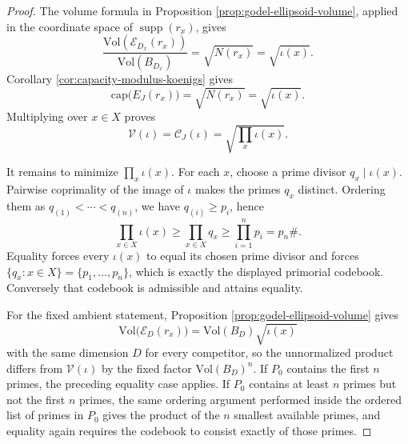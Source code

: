\begin{proof}
The volume formula in Proposition \ref{prop:godel-ellipsoid-volume}, applied in the coordinate space of \(\operatorname{supp}(r_x)\), gives
\[
\frac{\mathrm{Vol}(\mathcal E_{D_x}(r_x))}{\mathrm{Vol}(B_{D_x})}
=\sqrt{N(r_x)}=\sqrt{\iota(x)}.
\]
Corollary \ref{cor:capacity-modulus-koenigs} gives
\[
\mathrm{cap}\bigl(E_J(r_x)\bigr)=\sqrt{N(r_x)}=\sqrt{\iota(x)}.
\]
Multiplying over \(x\in X\) proves
\[
\mathcal V(\iota)=\mathcal C_J(\iota)=\sqrt{\prod_x\iota(x)}.
\]

It remains to minimize \(\prod_x\iota(x)\). For each \(x\), choose a prime divisor \(q_x\mid\iota(x)\). Pairwise coprimality of the image of \(\iota\) makes the primes \(q_x\) distinct. Ordering them as \(q_{(1)}<\cdots<q_{(n)}\), we have \(q_{(i)}\ge p_i\), hence
\[
\prod_{x\in X}\iota(x)\ge \prod_{x\in X}q_x\ge\prod_{i=1}^{n}p_i=p_n\#.
\]
Equality forces every \(\iota(x)\) to equal its chosen prime divisor and forces \(\{q_x:x\in X\}=\{p_1,\dots,p_n\}\), which is exactly the displayed primorial codebook. Conversely that codebook is admissible and attains equality.

For the fixed ambient statement, Proposition \ref{prop:godel-ellipsoid-volume} gives
\[
\mathrm{Vol}\bigl(\mathcal E_D(r_x)\bigr)=\mathrm{Vol}(B_D)\sqrt{\iota(x)}
\]
with the same dimension \(D\) for every competitor, so the unnormalized product differs from \(\mathcal V(\iota)\) by the fixed factor \(\mathrm{Vol}(B_D)^n\). If \(P_0\) contains the first \(n\) primes, the preceding equality case applies. If \(P_0\) contains at least \(n\) primes but not the first \(n\) primes, the same ordering argument performed inside the ordered list of primes in \(P_0\) gives the product of the \(n\) smallest available primes, and equality again requires the codebook to consist exactly of those primes.
\end{proof}


